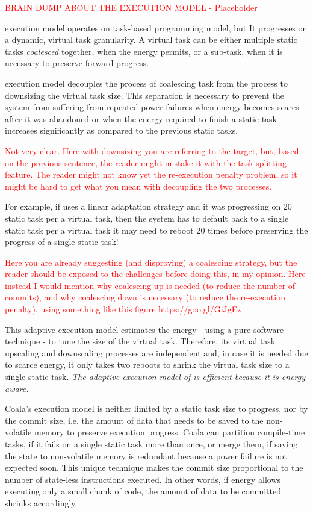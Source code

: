 \textcolor{red}{BRAIN DUMP ABOUT THE EXECUTION MODEL - Placeholder}

\sys execution model operates on task-based programming model, but It progresses on a dynamic, virtual task granularity. A virtual task can be either multiple static tasks \emph{coalesced} together, when the energy permits, or a sub-task, when it is necessary to preserve forward progress.

\sys execution model decouples the process of coalescing task from the process to downsizing the virtual task size. This separation is necessary to prevent the system from suffering from repeated power failures when energy becomes scares after it was abandoned or when the energy required to finish a static task increases significantly as compared to the previous static tasks.
 
\textcolor{red}{Not very clear. Here with downsizing you are referring to the target, but, based on the previous sentence, the reader might mistake it with the task splitting feature. The reader might not know yet the re-execution penalty problem, so it might be hard to get what you mean with decoupling the two processes.}

For example, if \sys uses a linear adaptation strategy and it was progressing on 20 static task per a virtual task, then the system has to default back to a single static task per a virtual task it may need to reboot 20 times before preserving the progress of a single static task!

\textcolor{red}{
Here you are already suggesting (and disproving) a coalescing strategy, but the reader should be exposed to the challenges before doing this, in my opinion. Here instead I would mention why coalescing up is needed (to reduce the number of commits), and why coalescing down is necessary (to reduce the re-execution penalty), using something like this figure https://goo.gl/GiJgEz}


This adaptive execution model estimates the energy - using a pure-software technique - to tune the size of the virtual task. Therefore, its virtual task upscaling and downscaling processes are independent and, in case it is needed due to scarce energy, it only takes two reboots to shrink the virtual task size to a single static task. \emph{The adaptive execution model of \sys is efficient because it is energy aware.}

Coala's execution model is neither limited by a static task size to progress, nor by the commit size, i.e. the amount of data that needs to be saved to the non-volatile memory to preserve execution progress. Coala can partition compile-time tasks, if it fails on a single static task more than once, or merge them, if saving the state to non-volatile memory is redundant because a power failure is not expected soon. This unique technique makes the commit size proportional to the number of state-less instructions executed. In other words, if energy allows executing only a small chunk of code, the amount of data to be committed shrinks accordingly.



